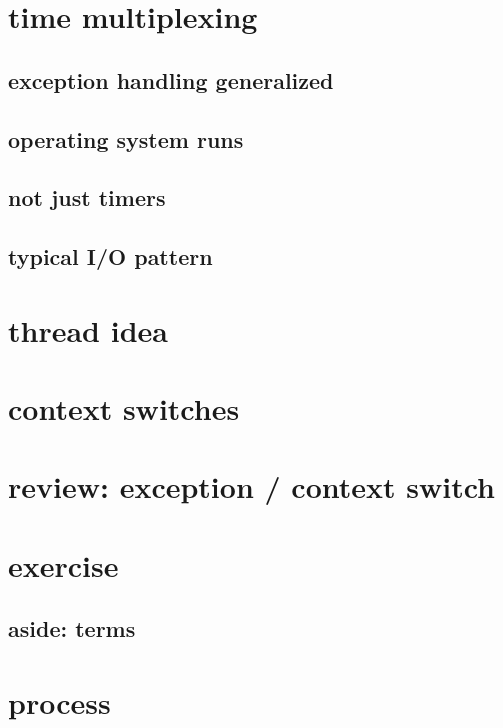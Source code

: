 
\section{time multiplexing}


\subsection{exception handling generalized}


\subsection{operating system runs}


\subsection{not just timers}




\subsection{typical I/O pattern}


\section{thread idea}


\section{context switches} 


\section{review: exception / context switch}


\section{exercise}


\subsection{aside: terms}



\section{process}


